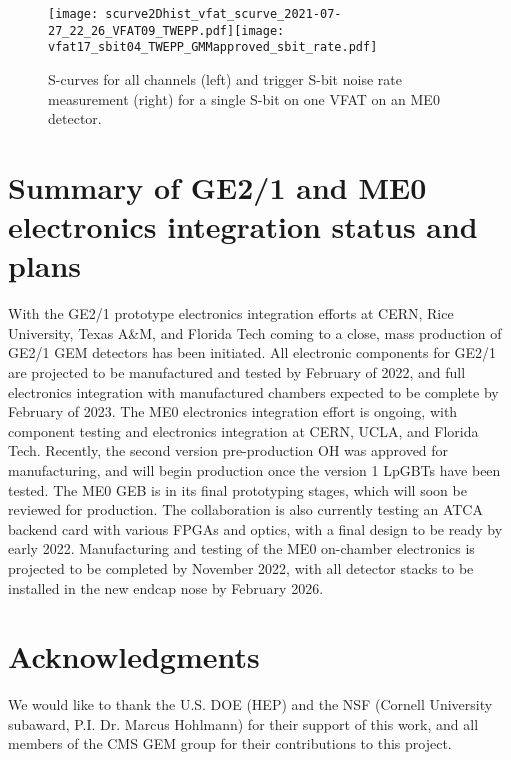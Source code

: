 \documentclass[a4paper,11pt]{article}
\begin{document}
\begin{figure}[!hp]
\centering
\texttt{[image: scurve2Dhist\_vfat\_scurve\_2021-07-27\_22\_26\_VFAT09\_TWEPP.pdf]}\hspace*{0.2cm}\texttt{[image: vfat17\_sbit04\_TWEPP\_GMMapproved\_sbit\_rate.pdf]}
\caption{\label{fig:2Dhist_sbit}S-curves for all channels (left) and trigger S-bit noise rate measurement (right) for a single S-bit on one VFAT on an ME0 detector.}
\end{figure}

\section{Summary of GE2/1 and ME0 electronics integration status and plans}
With the GE2/1 prototype electronics integration efforts at CERN, Rice University, Texas A\&M, and Florida Tech coming to a close, mass production of GE2/1 GEM detectors has been initiated. All electronic components for GE2/1 are projected to be manufactured and tested by February of 2022, and full electronics integration with manufactured chambers expected to be complete by February of 2023. The ME0 electronics integration effort is ongoing, with component testing and electronics integration at CERN, UCLA, and Florida Tech. Recently, the second version pre-production OH was approved for manufacturing, and will begin production once the version 1 LpGBTs have been tested. The ME0 GEB is in its final prototyping stages, which will soon be reviewed for production. The collaboration is also currently testing an ATCA backend card with various FPGAs and optics, with a final design to be ready by early 2022. Manufacturing and testing of the ME0 on-chamber electronics is projected to be completed by November 2022, with all detector stacks to be installed in the new endcap nose by February 2026. 

\section*{Acknowledgments}
We would like to thank the U.S. DOE (HEP) and the NSF (Cornell University subaward, P.I. Dr. Marcus Hohlmann) for their support of this work, and all members of the CMS GEM group for their contributions to this project.
\end{document}
